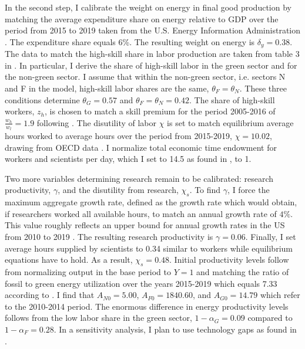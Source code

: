 In the second step, I calibrate the weight on energy in final good production by matching the average expenditure share on energy relative to GDP over the period from 2015 to 2019 taken from the U.S. Energy Information Administration \citep[][Table 1.7]{EIAEnergy}. The expenditure share equals 6\%. The resulting weight on energy is $\delta_y=0.38$. %
 The data to match the high-skill share in labor production are taken from table 3 in \cite{Consoli2016DoCapital}. In particular, I derive the share of high-skill labor in the green sector and for the non-green sector. I assume that within the non-green sector, i.e. sectors N and F in the model, high-skill labor shares are the same, $\theta_F=\theta_N$.  These three conditions determine $\theta_G=0.57$ and $\theta_F=\theta_N=0.42$. The share of high-skill workers, $z_h$, is chosen to match a skill premium for the period 2005-2016 of $\frac{w_h}{w_l}=1.9$ following \cite{Slavik2020WagePremium}. The disutility of labor $\chi$ is set to match equilibrium average hours worked to average hours over the period from 2015-2019, $\chi=10.02$, drawing from OECD data \citep{OECDHoursworked}. I normalize total economic time endowment for workers and scientists per day, which I set to 14.5 as found in \cite{Jones1993OptimalGrowth}, to 1. 

 Two more variables determining research remain to be calibrated: research productivity, $\gamma$, and the disutility from research, $\chi_s$.
 To find $\gamma$, I force the maximum aggregate growth rate, defined as the growth rate which would obtain, if researchers worked all available hours, to match an annual growth rate of $4\%$. This value roughly reflects an upper bound for annual growth rates in the US from 2010 to 2019 \citep[compare][]{OECDGDP}.
  The resulting research productivity is $\gamma = 0.06$.  Finally, I set average hours supplied by scientists to 0.34 similar to workers while equilibrium equations have to hold. As a result,  $\chi_s=0.48$. Initial productivity levels follow from normalizing output in the base period to $Y=1$ and matching the ratio of fossil to green energy utilization over the years 2015-2019 which equals 7.33 according to \cite[][Table 1.3]{EIAEnergy}. I find that $A_{N0}=5.00$, $A_{F0}=1840.60$, and $A_{G0}=14.79$ which refer to the 2010-2014 period. The enormous difference in energy productivity levels follows from the low labor share in the green sector, $1-\alpha_G=0.09$ compared to $1-\alpha_F= 0.28$. In a sensitivity analysis, I plan to use technology gaps as found in \cite{Fried2018ClimateAnalysis}. 

